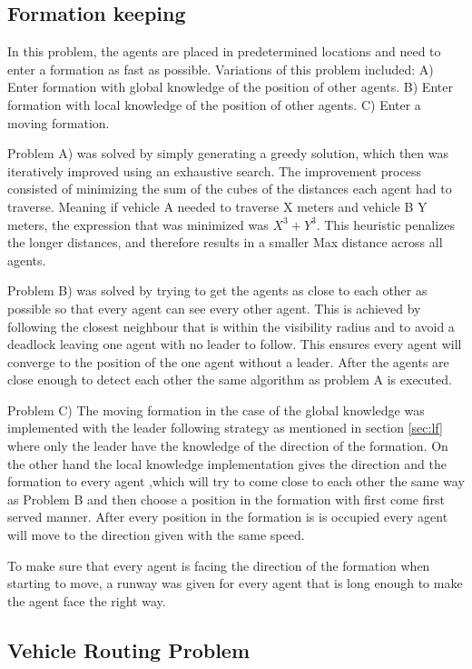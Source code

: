 \documentclass[a4paper,12pt]{article}
\begin{document}
\subsection{Formation keeping}
\label{sec:mmImpl}
In this problem, the agents are placed in predetermined locations and need to enter a formation as fast as possible. Variations of this problem included:
A) Enter formation with global knowledge of the position of other agents.
B) Enter formation with local knowledge of the position of other agents.
C) Enter a moving formation.

Problem A) was solved by simply generating a greedy solution, which then was iteratively improved using an exhaustive search. The improvement process consisted of minimizing the sum of the cubes of the distances each agent had to traverse.
Meaning if vehicle A needed to traverse X meters and vehicle B Y meters, the expression that was minimized was $X^3+Y^3$. This heuristic penalizes the longer distances, and therefore results in a smaller Max distance across all agents. 

Problem B) was solved by trying to get the agents as close to each other as possible so that every agent can see every other agent. This is achieved by following the closest neighbour that is within the visibility radius and to avoid a deadlock leaving one agent with no leader to follow. This ensures every agent will converge to the position of the one agent without a leader. After the agents are close enough to detect each other the same algorithm as problem A is executed.  

Problem C) The moving formation in the case of the global knowledge was implemented with the leader following strategy as mentioned in section \ref{sec:lf} where only the leader have the knowledge of the direction of the formation. On the other hand the local knowledge implementation gives the direction and the formation to every agent ,which will try to come close to each other the same way as Problem B and then choose a position in the formation with first come first served manner. After every position in the formation is is occupied every agent will move to the direction given with the same speed. 

To make sure that every agent is facing the direction of the formation when starting to move, a runway was given for every agent that is long enough to make the agent face the right way.

\subsection{Vehicle Routing Problem}
\label{sec:pf}
\end{document}
